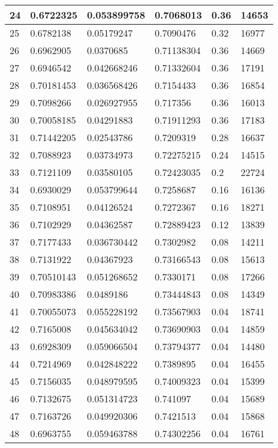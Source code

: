 \begin{longtable}{|l|l|l|l|l|l|}
24 & 0.6722325 & 0.053899758 & 0.7068013 & 0.36 & 14653 \\ \hline 
25 & 0.6782138 & 0.05179247 & 0.7090476 & 0.32 & 16977 \\ \hline 
26 & 0.6962905 & 0.0370685 & 0.71138304 & 0.36 & 14669 \\ \hline 
27 & 0.6946542 & 0.042668246 & 0.71332604 & 0.36 & 17191 \\ \hline 
28 & 0.70181453 & 0.036568426 & 0.7154433 & 0.36 & 16854 \\ \hline 
29 & 0.7098266 & 0.026927955 & 0.717356 & 0.36 & 16013 \\ \hline 
30 & 0.70058185 & 0.04291883 & 0.71911293 & 0.36 & 17183 \\ \hline 
31 & 0.71442205 & 0.02543786 & 0.7209319 & 0.28 & 16637 \\ \hline 
32 & 0.7088923 & 0.03734973 & 0.72275215 & 0.24 & 14515 \\ \hline 
33 & 0.7121109 & 0.03580105 & 0.72423035 & 0.2 & 22724 \\ \hline 
34 & 0.6930029 & 0.053799644 & 0.7258687 & 0.16 & 16136 \\ \hline 
35 & 0.7108951 & 0.04126524 & 0.7272367 & 0.16 & 18271 \\ \hline 
36 & 0.7102929 & 0.04362587 & 0.72889423 & 0.12 & 13839 \\ \hline 
37 & 0.7177433 & 0.036730442 & 0.7302982 & 0.08 & 14211 \\ \hline 
38 & 0.7131922 & 0.04367923 & 0.73166543 & 0.08 & 15613 \\ \hline 
39 & 0.70510143 & 0.051268652 & 0.7330171 & 0.08 & 17266 \\ \hline 
40 & 0.70983386 & 0.0489186 & 0.73444843 & 0.08 & 14349 \\ \hline 
41 & 0.70055073 & 0.055228192 & 0.73567903 & 0.04 & 18741 \\ \hline 
42 & 0.7165008 & 0.045634042 & 0.73690903 & 0.04 & 14859 \\ \hline 
43 & 0.6928309 & 0.059066504 & 0.73794377 & 0.04 & 14480 \\ \hline 
44 & 0.7214969 & 0.042848222 & 0.7389895 & 0.04 & 16455 \\ \hline 
45 & 0.7156035 & 0.048979595 & 0.74009323 & 0.04 & 15399 \\ \hline 
46 & 0.7132675 & 0.051314723 & 0.741097 & 0.04 & 15689 \\ \hline 
47 & 0.7163726 & 0.049920306 & 0.7421513 & 0.04 & 15868 \\ \hline 
48 & 0.6963755 & 0.059463788 & 0.74302256 & 0.04 & 16761 \\ \hline 

\end{longtable}
